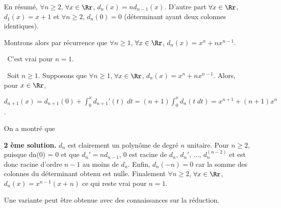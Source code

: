 {\begin{enumerate}
{En résumé, $\forall n\geqslant 2$, $\forall x\in\Rr$, $d_n(x)=nd_{n-1}(x)$. D'autre part $\forall x\in\Rr$, $d_1(x)=x+1$ et $\forall n\geqslant 2$, $d_n(0) = 0$ (déterminant ayant deux colonnes identiques).

Montrons alors par récurrence que 
$\forall n\geqslant 1$, $\forall x\in\Rr$, $d_n(x) =x^n+nx^{n-1}$.

\textbullet~C'est vrai pour $n=1$.

\textbullet~Soit $n\geqslant1$. Supposons que $\forall n\geqslant 1$, $\forall x\in\Rr$, $d_n(x) =x^n+nx^{n-1}$. Alors, pour $x\in\Rr$,

\begin{center}
$d_{n+1}(x)=d_{n+1}(0)+\int_{0}^{x}d_{n+1}'(t)\;dt=(n+1)\int_{0}^{x}d_n(t\;dt)=x^{n+1}+(n+1)x^n$.
\end{center}

On a montré que

\begin{center}
\end{center}

\textbf{2 ème solution.} $d_n$ est clairement un polynôme de degré $n$ unitaire.
Pour $n\geqslant 2$, puisque dn(0) = 0 et que $d_n'= nd_{n-1}$, $0$ est racine de $d_n$, $d_n'$, ..., $d_n^{(n-2)}$ et est donc racine d'ordre $n-1$ au moins de $d_n$. 
Enfin, $d_n(-n)=0$ car la somme des colonnes du déterminant obtenu est nulle.
Finalement $\forall n\geqslant2$, $\forall x\in\Rr$, $d_n(x) = x^{n-1}(x+n)$ ce qui reste vrai pour $n=1$.

Une variante peut être obtenue avec des connaissances sur la réduction.}
\end{enumerate}
}
